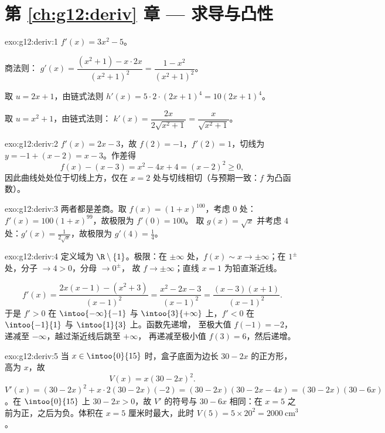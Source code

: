 \section*{第 \ref{ch:g12:deriv} 章 --- 求导与凸性}

\begin{solution}{exo:g12:deriv:1}
$f'(x) = 3x^2 - 5$。

商法则：
$g'(x) = \dfrac{(x^2+1) - x\cdot 2x}{(x^2+1)^2} = \dfrac{1 - x^2}{(x^2+1)^2}$。

取 $u = 2x+1$，由链式法则 $h'(x) = 5 \cdot 2 \cdot (2x+1)^4 = 10(2x+1)^4$。

取 $u = x^2 + 1$，由链式法则：
$k'(x) = \dfrac{2x}{2\sqrt{x^2+1}} = \dfrac{x}{\sqrt{x^2+1}}$。
\end{solution}

\begin{solution}{exo:g12:deriv:2}
$f'(x) = 2x - 3$，故 $f(2) = -1$，$f'(2) = 1$，切线为
$y = -1 + (x - 2) = x - 3$。作差得
\[
f(x) - (x - 3) = x^2 - 4x + 4 = (x-2)^2 \geq 0 ,
\]
因此曲线处处位于切线上方，仅在 $x = 2$
处与切线相切（与预期一致：$f$ 为凸函数）。
\end{solution}

\begin{solution}{exo:g12:deriv:3}
两者都是差商。取 $f(x) = (1+x)^{100}$，考虑 $0$ 处：
$f'(x) = 100(1+x)^{99}$，故极限为 $f'(0) = 100$。
取 $g(x) = \sqrt{x}$ 并考虑 $4$ 处：$g'(x) = \frac{1}{2\sqrt{x}}$，故极限为
$g'(4) = \frac14$。
\end{solution}

\begin{solution}{exo:g12:deriv:4}
定义域为 $\R \setminus \{1\}$。极限：在 $\pm\infty$ 处，$f(x) \sim x \to
\pm\infty$；在 $1^\pm$ 处，分子 $\to 4 > 0$，分母 $\to 0^\pm$，
故 $f \to \pm\infty$；直线 $x = 1$ 为铅直渐近线。

\[
f'(x) = \frac{2x(x-1) - (x^2+3)}{(x-1)^2} = \frac{x^2 - 2x - 3}{(x-1)^2}
= \frac{(x-3)(x+1)}{(x-1)^2}.
\]
于是 $f' > 0$ 在 $\intoo{-\infty}{-1}$ 与 $\intoo{3}{+\infty}$ 上，$f' < 0$ 在
$\intoo{-1}{1}$ 与 $\intoo{1}{3}$ 上。函数先递增，
至极大值 $f(-1) = -2$，递减至 $-\infty$，越过渐近线后跳至 $+\infty$，
再递减至极小值 $f(3) = 6$，然后递增。
\end{solution}

\begin{solution}{exo:g12:deriv:5}
当 $x \in \intoo{0}{15}$ 时，盒子底面为边长 $30 - 2x$ 的正方形，
高为 $x$，故
\[
V(x) = x(30 - 2x)^2 .
\]
$V'(x) = (30-2x)^2 + x \cdot 2(30-2x)(-2) = (30-2x)(30 - 2x - 4x)
= (30-2x)(30-6x)$。在 $\intoo{0}{15}$ 上 $30 - 2x > 0$，故 $V'$ 的符号与
$30 - 6x$ 相同：在 $x = 5$ 之前为正，之后为负。体积在
$x = 5$ 厘米时最大，此时 $V(5) = 5 \times 20^2 = 2000\ \text{cm}^3$。
\end{solution}

